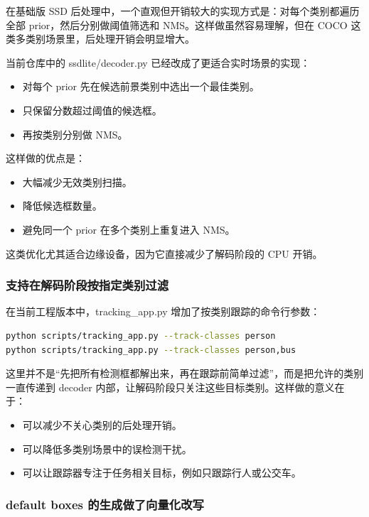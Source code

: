 在基础版 SSD
后处理中，一个直观但开销较大的实现方式是：对每个类别都遍历全部
prior，然后分别做阈值筛选和 NMS。这样做虽然容易理解，但在 COCO
这类多类别场景里，后处理开销会明显增大。

当前仓库中的 ssdlite/decoder.py 已经改成了更适合实时场景的实现：

\begin{itemize}
\tightlist
\item
  对每个 prior 先在候选前景类别中选出一个最佳类别。
\item
  只保留分数超过阈值的候选框。
\item
  再按类别分别做 NMS。
\end{itemize}

这样做的优点是：

\begin{itemize}
\tightlist
\item
  大幅减少无效类别扫描。
\item
  降低候选框数量。
\item
  避免同一个 prior 在多个类别上重复进入 NMS。
\end{itemize}

这类优化尤其适合边缘设备，因为它直接减少了解码阶段的 CPU 开销。

\subsubsection{支持在解码阶段按指定类别过滤}\label{src-experiment-case2-h73}

在当前工程版本中，tracking\_app.py 增加了按类别跟踪的命令行参数：

\begin{lstlisting}[language=bash]
python scripts/tracking_app.py --track-classes person
python scripts/tracking_app.py --track-classes person,bus
\end{lstlisting}

这里并不是``先把所有检测框都解出来，再在跟踪前简单过滤''，而是把允许的类别一直传递到
decoder 内部，让解码阶段只关注这些目标类别。这样做的意义在于：

\begin{itemize}
\tightlist
\item
  可以减少不关心类别的后处理开销。
\item
  可以降低多类别场景中的误检测干扰。
\item
  可以让跟踪器专注于任务相关目标，例如只跟踪行人或公交车。
\end{itemize}

\subsubsection{default boxes
的生成做了向量化改写}\label{src-experiment-case2-h74}

